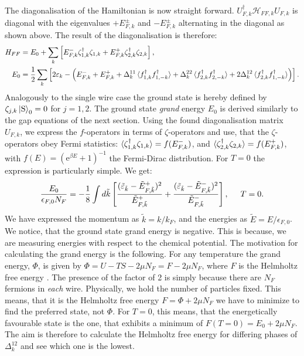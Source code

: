 The diagonalisation of the Hamiltonian is now straight forward. $U^\dagger_{F,k}\mathcal{H}_{FF,k}U_{F,k}$ is diagonal with the eigenvalues $+E^{\pm}_{F,k}$ and $-E^{\pm}_{F,k}$ alternating in the diagonal as shown above. The result of the diagonalisation is therefore:
\begin{align}
H_{FF} &= E_0 + \sum_{k} \left[ E^{-}_{F,k}\zeta^\dagger_{1, k}\zeta_{1, k} + E^{+}_{F,k}\zeta^\dagger_{2, k}\zeta_{2, k} \right], \nonumber \\ 
E_0 &= \frac{1}{2}\sum_k \left[2\varepsilon_k - \left( E^{-}_{F,k} + E^{+}_{F,k} + \Delta^{11}_k\braket{f^\dagger_{1,k}f^\dagger_{1,-k}} + \Delta^{22}_k\braket{f^\dagger_{2,k}f^\dagger_{2,-k}} + 2\Delta^{12}_k\braket{f^\dagger_{2,k}f^\dagger_{1,-k}} \right) \right]. 
\label{eq.2wiresDiagonalisedHamiltonian}
\end{align}  
Analogously to the single wire case the ground state is hereby defined by $\zeta_{j,k}\ket{\text{S}}_0 = 0$ for $j = 1, 2$. The ground state \textit{grand} energy $E_0$ is derived similarly to the gap equations of the next section. Using the found diagonalisation matrix $U_{F,k}$, we express the $f$-operators in terms of $\zeta$-operators and use, that the $\zeta$-operators obey Fermi statistics: $\braket{\zeta^\dagger_{1,k}\zeta_{1,k}} = f(E^{-}_{F,k})$, and $\braket{\zeta^\dagger_{2,k}\zeta_{2,k}} = f(E^{+}_{F,k})$, with $f(E) = (\text{e}^{\beta E} + 1)^{-1}$ the Fermi-Dirac distribution. For $T=0$ the expression is particularly simple. We get:
\begin{equation}
\frac{E_0}{\epsilon_{F,0} N_F} = -\frac{1}{8} \int d\tilde{k} \left[\frac{(\tilde{\varepsilon}_{\tilde{k}} - \tilde{E}^{+}_{F, \tilde{k}})^2}{\tilde{E}^{+}_{F, \tilde{k}}} + \frac{(\tilde{\varepsilon}_{\tilde{k}} - \tilde{E}^{-}_{F, \tilde{k}})^2}{\tilde{E}^{-}_{F, \tilde{k}}}\right], \hspace{0.5cm} T = 0. 
\label{eq.2wiresGrandGroundStateEnergy}
\end{equation}
We have expressed the momentum as $\tilde{k} = k/k_F$, and the energies as $\tilde{E} = E/\epsilon_{F,0}$. We notice, that the ground state grand energy is negative. This is because, we are measuring energies with respect to the chemical potential. The motivation for calculating the grand energy is the following. For any temperature the grand energy, $\Phi$, is given by $\Phi = U - TS - 2\mu N_F = F - 2\mu N_F$, where $F$ is the Helmholtz free energy \cite{SchroederThermal}. The presence of the factor of 2 is simply because there are $N_F$ fermions in \textit{each} wire. Physically, we hold the number of particles fixed. This means, that it is the Helmholtz free energy $F = \Phi + 2\mu N_F$ we have to minimize to find the preferred state, not $\Phi$. For $T = 0$, this means, that the energetically favourable state is the one, that exhibits a minimum of $F(T = 0) = E_0 + 2\mu N_F$. The aim is therefore to calculate the Helmholtz free energy for differing phases of $\Delta^{12}_k$ and see which one is the lowest. 

